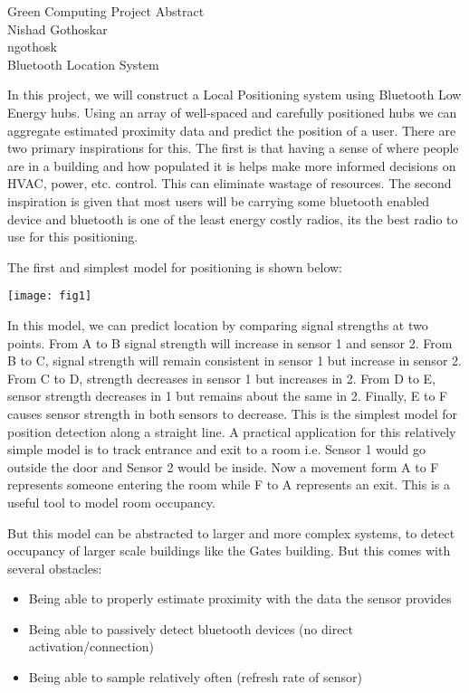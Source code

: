 \documentclass[11pt]{article}
\newcommand{\myname}{Nishad Gothoskar}
\newcommand{\myandrew}{ngothosk}
\begin{document}
	
	\medskip                        %
	
	\thispagestyle{plain}
	\begin{center}                  %
		{\Large Green Computing Project Abstract} \\
		\myname \\
		\myandrew \\
	\huge{Bluetooth Location System}
\end{center}
\quad In this project, we will construct a Local Positioning system using Bluetooth Low Energy hubs. Using an array of well-spaced and carefully positioned hubs we can aggregate estimated proximity data and predict the position of a user. There are two primary inspirations for this. The first is that having a sense of where people are in a building and how populated it is helps make more informed decisions on HVAC, power, etc. control. This can eliminate wastage of resources. The second inspiration is given that most users will be carrying some bluetooth enabled device and bluetooth is one of the least energy costly radios, its the best radio to use for this positioning.

\quad The first and simplest model for positioning is shown below: 
\begin{center}
	\texttt{[image: fig1]}
\end{center}


\quad In this model, we can predict location by comparing signal strengths at two points. From A to B signal strength will increase in sensor 1 and sensor 2. From B to C, signal strength will remain consistent in sensor 1 but increase in sensor 2. From C to D, strength decreases in sensor 1 but increases in 2. From D to E, sensor strength decreases in 1 but remains about the same in 2. Finally, E to F causes sensor strength in both sensors to decrease. This is the simplest model for position detection along a straight line. A practical application for this relatively simple model is to track entrance and exit to a room i.e. Sensor 1 would go outside the door and Sensor 2 would be inside. Now a movement form A to F represents someone entering the room while F to A represents an exit. This is a useful tool to model room occupancy.

\quad But this model can be abstracted to larger and more complex systems, to detect occupancy of larger scale buildings like the Gates building. But this comes with several obstacles:
\begin{itemize}
	\item Being able to properly estimate proximity with the data the sensor provides
	\item Being able to passively detect bluetooth devices (no direct activation/connection)
	\item Being able to sample relatively often (refresh rate of sensor)
\end{itemize} 
\end{document}
